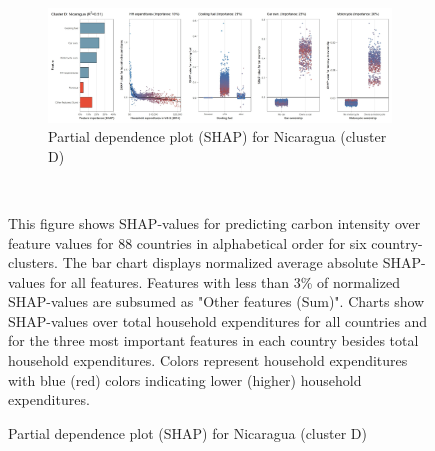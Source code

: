 \begin{figure}[ht!]
    \vspace{0.5cm}
   \begin{subfigure}[b]{\textwidth} 
   \centering
         \caption{Partial dependence plot (SHAP) for Nicaragua (cluster D)}
         \label{fig:5b_NIC}
         \includegraphics[width=\textwidth]{Figure 5b/Figure_5b_NIC}    
   \end{subfigure}
    \\
    \vspace{0.5cm}
   
    \begin{subcaption2}
     This figure shows SHAP-values for predicting carbon intensity over feature values for 88 countries in alphabetical order for six country-clusters. The bar chart displays normalized average absolute SHAP-values for all features. Features with less than 3\% of normalized SHAP-values are subsumed as "Other features (Sum)". Charts show SHAP-values over total household expenditures for all countries and for the three most important features in each country besides total household expenditures. Colors represent household expenditures with blue (red) colors indicating lower (higher) household expenditures.
     \end{subcaption2}
\end{figure}

